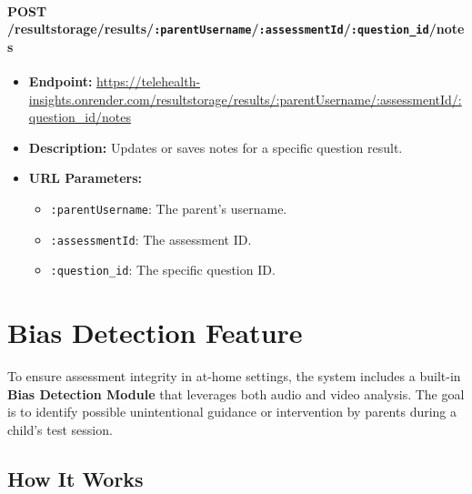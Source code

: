 \documentclass{article}
\begin{document}
  \paragraph{POST /resultstorage/results/\texttt{:parentUsername}/\texttt{:assessmentId}/\texttt{:question\_id}/notes}
  \begin{itemize}
      \item \textbf{Endpoint:} 
          \url{https://telehealth-insights.onrender.com/resultstorage/results/:parentUsername/:assessmentId/:question_id/notes}
      \item \textbf{Description:} Updates or saves notes for a specific question result.
      \item \textbf{URL Parameters:}
      \begin{itemize}
          \item \texttt{:parentUsername}: The parent’s username.
          \item \texttt{:assessmentId}: The assessment ID.
          \item \texttt{:question\_id}: The specific question ID.
      \end{itemize}
  \end{itemize}
  

\section{Bias Detection Feature}

To ensure assessment integrity in at-home settings, the system includes a built-in \textbf{Bias Detection Module} that leverages both audio and video analysis. The goal is to identify possible unintentional guidance or intervention by parents during a child’s test session.

\subsection*{How It Works}
\end{document}
